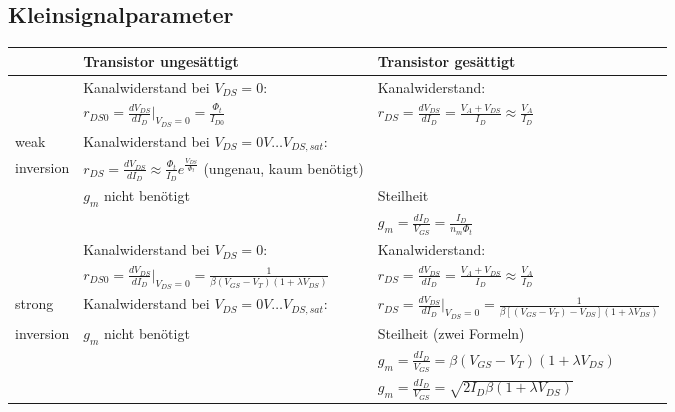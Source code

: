 \subsection{Kleinsignalparameter}
\begin{tabularx}{\linewidth}{|X|l|l|}
	\hline
		& \textbf{Transistor ungesättigt} & \textbf{Transistor gesättigt} 
	\\ \hline
		& Kanalwiderstand bei $V_{DS}=0$:
		& Kanalwiderstand:
	\\
		& $r_{DS0} = \frac{dV_{DS}}{dI_D}|_{V_{DS}=0} = \frac{\Phi_t}{I_{D0}}$
		& $r_{DS} = \frac{dV_{DS}}{dI_D} = \frac{V_A + V_{DS}}{I_D} \approx \frac{V_A}{I_D}$
	\\ weak
		& Kanalwiderstand bei $V_{DS} = 0V \dots V_{DS,sat}$:
		& 
	\\ inversion
		& $r_{DS} = \frac{dV_{DS}}{dI_D} \approx \frac{\Phi_t}{I_D} e^{\frac{V_{DS}}{\Phi_t}}$ (ungenau, kaum benötigt)
		&
	\\ \cline{2-3}
		& $g_m$ nicht benötigt
		& Steilheit
	\\
		& 
		& $g_m =  \frac{dI_D}{V_{GS}} = \frac{I_D}{n_m \Phi_t}$	
	\\ \hline
		& Kanalwiderstand bei $V_{DS}=0$:
		& Kanalwiderstand:
	\\
		& $r_{DS0} = \frac{dV_{DS}}{dI_D}|_{V_{DS}=0} = \frac{1}{\beta (V_{GS} - V_T) (1 + \lambda V_{DS})}$
		& $r_{DS} = \frac{dV_{DS}}{dI_D} = \frac{V_A + V_{DS}}{I_D} \approx \frac{V_A}{I_D}$
	\\ strong
		& Kanalwiderstand bei $V_{DS} = 0V \dots V_{DS,sat}$:
		& $r_{DS} = \frac{dV_{DS}}{dI_D}|_{V_{DS}=0} = \frac{1}{\beta [(V_{GS} - V_T)-V_{DS}] (1 + \lambda V_{DS})}$
	\\ \cline{2-3} inversion
		& $g_m$ nicht benötigt
		& Steilheit (zwei Formeln)
	\\
		&
		& $g_m = \frac{dI_D}{V_{GS}} = \beta (V_{GS} - V_T) (1 + \lambda V_{DS})$
	\\
		&
		& $g_m = \frac{dI_D}{V_{GS}} = \sqrt{2 I_D \beta (1 + \lambda V_{DS})} $
	\\ \hline
\end{tabularx}


